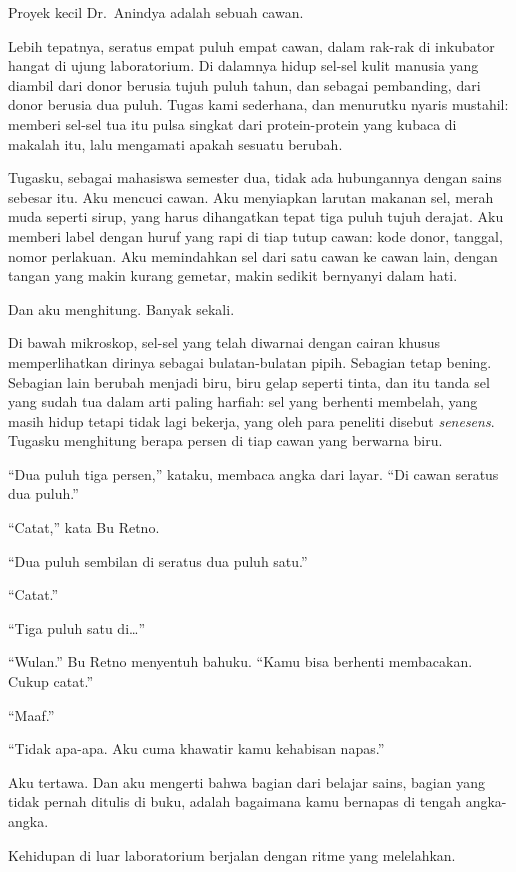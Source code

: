 \documentclass[11pt,twoside,openany]{book}
\makeatletter
\newcommand{\scenebreak}{\par\vspace{0.9em}{\centering\textsc{*\hspace{0.7em}*\hspace{0.7em}*}\par}\vspace{0.9em}\@afterindentfalse\@afterheading}
\makeatother
\begin{document}
\scenebreak
Proyek kecil Dr.~Anindya adalah sebuah cawan.

Lebih tepatnya, seratus empat puluh empat cawan, dalam rak-rak di inkubator hangat di ujung laboratorium. Di dalamnya hidup sel-sel kulit manusia yang diambil dari donor berusia tujuh puluh tahun, dan sebagai pembanding, dari donor berusia dua puluh. Tugas kami sederhana, dan menurutku nyaris mustahil: memberi sel-sel tua itu pulsa singkat dari protein-protein yang kubaca di makalah itu, lalu mengamati apakah sesuatu berubah.

Tugasku, sebagai mahasiswa semester dua, tidak ada hubungannya dengan sains sebesar itu. Aku mencuci cawan. Aku menyiapkan larutan makanan sel, merah muda seperti sirup, yang harus dihangatkan tepat tiga puluh tujuh derajat. Aku memberi label dengan huruf yang rapi di tiap tutup cawan: kode donor, tanggal, nomor perlakuan. Aku memindahkan sel dari satu cawan ke cawan lain, dengan tangan yang makin kurang gemetar, makin sedikit bernyanyi dalam hati.

Dan aku menghitung. Banyak sekali.

Di bawah mikroskop, sel-sel yang telah diwarnai dengan cairan khusus memperlihatkan dirinya sebagai bulatan-bulatan pipih. Sebagian tetap bening. Sebagian lain berubah menjadi biru, biru gelap seperti tinta, dan itu tanda sel yang sudah tua dalam arti paling harfiah: sel yang berhenti membelah, yang masih hidup tetapi tidak lagi bekerja, yang oleh para peneliti disebut \emph{senesens}. Tugasku menghitung berapa persen di tiap cawan yang berwarna biru.

``Dua puluh tiga persen,'' kataku, membaca angka dari layar. ``Di cawan seratus dua puluh.''

``Catat,'' kata Bu Retno.

``Dua puluh sembilan di seratus dua puluh satu.''

``Catat.''

``Tiga puluh satu di\ldots{}''

``Wulan.'' Bu Retno menyentuh bahuku. ``Kamu bisa berhenti membacakan. Cukup catat.''

``Maaf.''

``Tidak apa-apa. Aku cuma khawatir kamu kehabisan napas.''

Aku tertawa. Dan aku mengerti bahwa bagian dari belajar sains, bagian yang tidak pernah ditulis di buku, adalah bagaimana kamu bernapas di tengah angka-angka.

\scenebreak
Kehidupan di luar laboratorium berjalan dengan ritme yang melelahkan.
\end{document}
